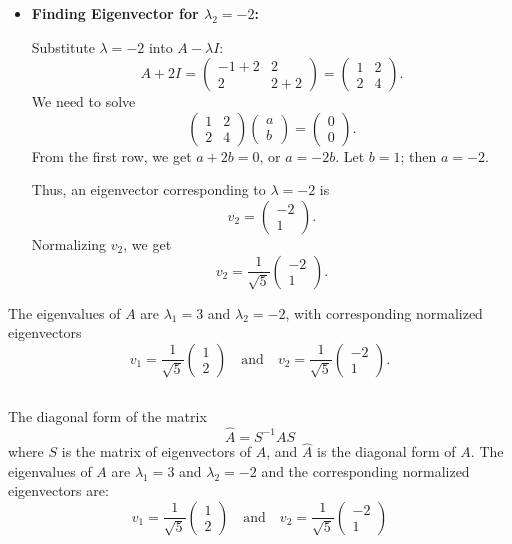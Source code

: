 \documentclass{article}
\begin{document}
\begin{itemize}
    \item \textbf{Finding Eigenvector for \( \lambda_2 = -2 \):}

          Substitute \( \lambda = -2 \) into \( A - \lambda I \):
          \[
              A + 2I = \begin{pmatrix} -1 + 2 & 2 \\ 2 & 2 + 2 \end{pmatrix} = \begin{pmatrix} 1 & 2 \\ 2 & 4 \end{pmatrix}.
          \]
          We need to solve
          \[
              \begin{pmatrix} 1 & 2 \\ 2 & 4 \end{pmatrix} \begin{pmatrix} a \\ b \end{pmatrix} = \begin{pmatrix} 0 \\ 0 \end{pmatrix}.
          \]
          From the first row, we get \( a + 2b = 0 \), or \( a = -2b \). Let \( b = 1 \); then \( a = -2 \).

          Thus, an eigenvector corresponding to \( \lambda = -2 \) is
          \[
              v_2 = \begin{pmatrix} -2 \\ 1 \end{pmatrix}.
          \]
          Normalizing \( v_2 \), we get
          \[
              v_2 = \frac{1}{\sqrt{5}} \begin{pmatrix} -2 \\ 1 \end{pmatrix}.
          \]
\end{itemize}

The eigenvalues of \( A \) are \( \lambda_1 = 3 \) and \( \lambda_2 = -2 \), with corresponding normalized eigenvectors
\[
    v_1 = \frac{1}{\sqrt{5}} \begin{pmatrix} 1 \\ 2 \end{pmatrix} \quad \text{and} \quad v_2 = \frac{1}{\sqrt{5}} \begin{pmatrix} -2 \\ 1 \end{pmatrix}.
\]
\subsection{}
The diagonal form of the matrix
\[
    \hat{A} = S^{-1} A S
\]
where \( S \) is the matrix of eigenvectors of \( A \), and \( \hat{A} \) is the diagonal form of \( A \).
The eigenvalues of \( A \) are \( \lambda_1 = 3 \) and \( \lambda_2 = -2 \) and the corresponding normalized eigenvectors are:
\[
    v_1 = \frac{1}{\sqrt{5}} \begin{pmatrix} 1 \\ 2 \end{pmatrix} \quad \text{and} \quad v_2 = \frac{1}{\sqrt{5}} \begin{pmatrix} -2 \\ 1 \end{pmatrix}
\]
\end{document}
